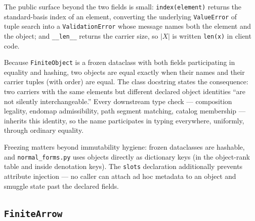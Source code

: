 The public surface beyond the two fields is small: \texttt{index(element)}
returns the standard-basis index of an element, converting the underlying
\texttt{ValueError} of tuple search into a \texttt{ValidationError} whose
message names both the element and the object; and \texttt{\_\_len\_\_}
returns the carrier size, so $|X|$ is written \texttt{len(x)} in client
code.

\begin{invariant}\label{ch09:inv:object-id}
Because \texttt{FiniteObject} is a frozen dataclass with both fields
participating in equality and hashing, two objects are equal exactly when
their names and their carrier tuples (with order) are equal. The class
docstring states the consequence: two carriers with the same elements but
different declared object identities ``are not silently interchangeable.''
Every downstream type check --- composition legality, endomap
admissibility, path segment matching, catalog membership --- inherits this
identity, so the name participates in typing everywhere, uniformly, through
ordinary equality.
\end{invariant}

Freezing matters beyond immutability hygiene: frozen dataclasses are
hashable, and \texttt{normal\_forms.py} uses objects directly as dictionary
keys (in the object-rank table and inside denotation keys). The
\texttt{slots} declaration additionally prevents attribute injection ---
no caller can attach ad hoc metadata to an object and smuggle state past
the declared fields.

\subsection{\texttt{FiniteArrow}}\label{ch09:sec:finitearrow}

